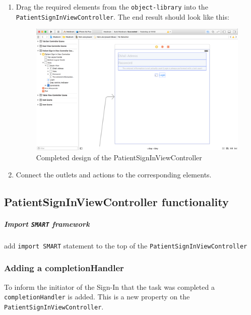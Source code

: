 \documentclass{article}
\begin{document}
\begin{enumerate}
\item
  Drag the required elements from the \texttt{object-library} into the \texttt{PatientSignInViewController}.
The end result should look like this:

\begin{figure}[H]
\centering
\includegraphics[width=\linewidth]{resources/step5/signin_interface.png}
\caption{Completed design of the PatientSignInViewController}
\label{fig:completed-signin-design}
\end{figure}

\item
Connect the outlets and actions to the corresponding elements.
\end{enumerate}

\subsection{PatientSignInViewController functionality}\label{step5-2}

\subparagraph{\texorpdfstring{Import \texttt{SMART}
framework}{Import SMART framework}}\label{step5:import-smart-framework}

add \texttt{import\ SMART} statement to the top of the
\texttt{PatientSignInViewController}

\subsubsection{Adding a completionHandler}\label{step5:add-a-completionhandler}

To inform the initiator of the Sign-In that the task was completed a \texttt{completionHandler} is added.
This is a new property on the \texttt{PatientSignInViewController}.
\end{document}
